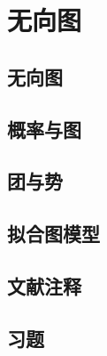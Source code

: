 \chapter{无向图}

\section{无向图}

\pending

\section{概率与图}

\pending

\section{团与势}

\pending

\section{拟合图模型}

\pending

\section{文献注释}

\pending

\section{习题}

\pending
